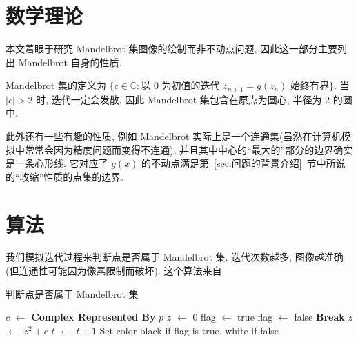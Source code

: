\documentclass{ctexart}
\begin{document}
\section{数学理论} %
\label{sec:数学理论}
本文着眼于研究 Mandelbrot 集图像的绘制而非不动点问题, 因此这一部分主要列出 Mandelbrot 自身的性质\cite{wiki-Madelbrot_set}. \par
Mandelbrot 集的定义为 $\{c \in \mathbb{C}: \text{以 } 0 \text{ 为初值的迭代 }z_{n + 1} = g(z_n)\text{ 始终有界}\}$. 当 $\left|c\right| > 2$ 时, 迭代一定会发散, 因此 Mandelbrot 集包含在原点为圆心, 半径为 $2$ 的圆中. \par
此外还有一些有趣的性质, 例如 Mandelbrot 实际上是一个连通集(虽然在计算机模拟中常常会因为精度问题而变得不连通), 并且其中中心的``最大的''部分的边界确实是一条心形线. 它对应了 $g(x)$ 的不动点满足第~\ref{sec:问题的背景介绍}~节中所说的``收缩''性质的点集的边界\cite{tbob-Mandelbrot}.
\section{算法} %
\label{sec:算法}
我们模拟迭代过程来判断点是否属于 Mandelbrot 集. 迭代次数越多, 图像越准确(但连通性可能因为像素限制而破坏). 这个算法来自\cite{Arnaud_Cheritat-wiki-Madelbrot_set}.\par
\begin{algorithm}[H]
\caption{判断点是否属于 Mandelbrot 集}
\label{algo::judge}
 {
	$c$ $\leftarrow$ \textbf{Complex Represented By} $p$\;
	$z$ $\leftarrow$ 0\;
	flag $\leftarrow$ true\;
	 {
		{
			flag $\leftarrow$ false\;
			\textbf{Break}\;
		}
		{
			$z$ $\leftarrow$ $z^2 + c$\;
			$t$ $\leftarrow$ $t + 1$\;
		}
	}
	Set color black if flag is true, white if false\;
}
\end{algorithm}
\end{document}
